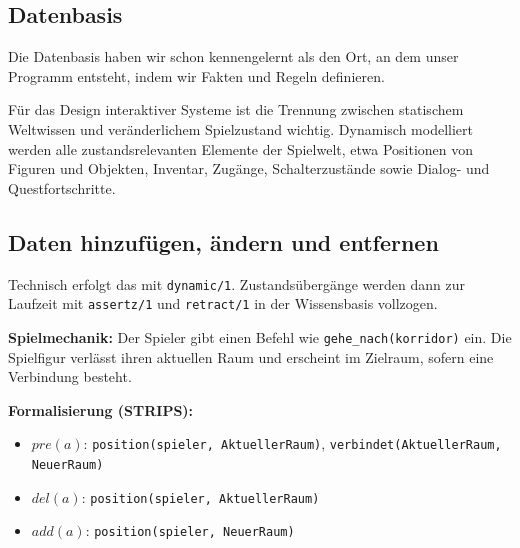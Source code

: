 \documentclass[parskip=half,a4paper,11pt]{scrreprt}
\begin{document}
\subsection{Datenbasis}
Die Datenbasis haben wir schon kennengelernt als den Ort, an dem unser Programm entsteht, indem wir Fakten und Regeln definieren.

Für das Design interaktiver Systeme ist die Trennung zwischen statischem Weltwissen und veränderlichem Spielzustand wichtig. Dynamisch modelliert werden alle zustandsrelevanten Elemente der Spielwelt, etwa Positionen von Figuren und Objekten, Inventar, Zugänge, Schalterzustände sowie Dialog- und Questfortschritte. 

\subsection{Daten hinzufügen, ändern und entfernen}

Technisch erfolgt das mit \texttt{dynamic/1}. Zustandsübergänge werden dann zur Laufzeit mit \texttt{assertz/1} und \texttt{retract/1} in der Wissensbasis vollzogen.

\textbf{Spielmechanik:} Der Spieler gibt einen Befehl wie \texttt{gehe\_nach(korridor)} ein. Die Spielfigur verlässt ihren aktuellen Raum und erscheint im Zielraum, sofern eine Verbindung besteht.

\textbf{Formalisierung (STRIPS):}
\begin{itemize}
    \item $pre(a)$: \texttt{position(spieler, AktuellerRaum)}, \texttt{verbindet(AktuellerRaum, NeuerRaum)}
    \item $del(a)$: \texttt{position(spieler, AktuellerRaum)}
    \item $add(a)$: \texttt{position(spieler, NeuerRaum)}
\end{itemize}
\end{document}

